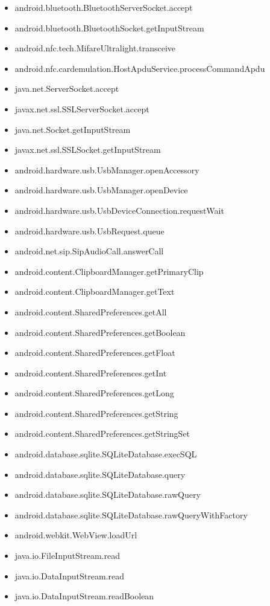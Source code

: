 \documentclass{sig-alternate}
\begin{document}
\begin{itemize}
\item android.bluetooth.BluetoothServerSocket.accept
\item android.bluetooth.BluetoothSocket.getInputStream
\item android.nfc.tech.MifareUltralight.transceive
\item android.nfc.cardemulation.HostApduService.processCommandApdu
\item java.net.ServerSocket.accept
\item javax.net.ssl.SSLServerSocket.accept
\item java.net.Socket.getInputStream
\item javax.net.ssl.SSLSocket.getInputStream
\item android.hardware.usb.UsbManager.openAccessory
\item android.hardware.usb.UsbManager.openDevice
\item android.hardware.usb.UsbDeviceConnection.requestWait
\item android.hardware.usb.UsbRequest.queue
\item android.net.sip.SipAudioCall.answerCall
\item android.content.ClipboardManager.getPrimaryClip
\item android.content.ClipboardManager.getText
\item android.content.SharedPreferences.getAll
\item android.content.SharedPreferences.getBoolean
\item android.content.SharedPreferences.getFloat
\item android.content.SharedPreferences.getInt
\item android.content.SharedPreferences.getLong
\item android.content.SharedPreferences.getString
\item android.content.SharedPreferences.getStringSet
\item android.database.sqlite.SQLiteDatabase.execSQL
\item android.database.sqlite.SQLiteDatabase.query
\item android.database.sqlite.SQLiteDatabase.rawQuery
\item android.database.sqlite.SQLiteDatabase.rawQueryWithFactory
\item android.webkit.WebView.loadUrl
\item java.io.FileInputStream.read
\item java.io.DataInputStream.read
\item java.io.DataInputStream.readBoolean

\end{itemize}
\end{document}
